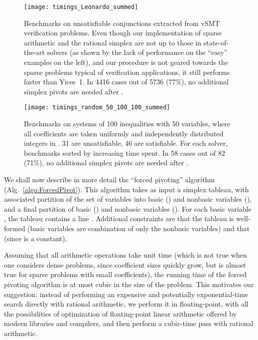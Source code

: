 \begin{figure}[htb]
\begin{center}
\texttt{[image: timings\_Leonardo\_summed]}
\end{center}
\caption{\footnotesize Benchmarks on unsatisfiable conjunctions extracted from vSMT verification problems. Even though our implementation of sparse arithmetic and the rational simplex are not up to those in state-of-the-art solvers (as shown by the lack of performance on the ``easy'' examples on the left), and our procedure is not geared towards the sparse problems typical of verification applications, it still performs faster than Yices~1. In 4416 cases out of 5736 (77\%), no additional simplex pivots are needed after .
}
\label{fig:benchmarks_Leonardo}
\end{figure}

\begin{figure}[htb]
\begin{center}
\texttt{[image: timings\_random\_50\_100\_100\_summed]}
\end{center}
\caption{\footnotesize Benchmarks on systems of 100 inequalities with 50 variables, where all coefficients are taken uniformly and independently distributed integers in . 31 are unsatisfiable, 46 are satisfiable. For each solver, benchmarks sorted by increasing time spent. In 58 cases out of 82 (71\%), no additional simplex pivots are needed after .}
\label{fig:benchmarks_random_50_100_100}
\end{figure}

We shall now describe in more detail the ``forced pivoting'' algorithm (Alg.~\ref{algo:ForcedPivot}). This algorithm takes as input a simplex tableau, with associated partition of the set  of variables into basic () and nonbasic variables (), and a final partition of basic () and nonbasic variables (). For each basic variable , the tableau contains a line .
Additional constraints are that the tableau is well-formed (basic variables are combination of only the nonbasic variables) and that  (since  is a constant).

Assuming that all arithmetic operations take unit time (which is not true when one considers dense problems, since coefficient sizes quickly grow, but is almost true for sparse problems with small coefficients), the running time of the forced pivoting algorithm is at most cubic in the size of the problem. This motivates our suggestion: instead of performing an expensive and potentially exponential-time search directly with rational arithmetic, we perform it in floating-point, with all the possibilities of optimization of floating-point linear arithmetic offered by modern libraries and compilers, and then perform a cubic-time pass with rational arithmetic.


